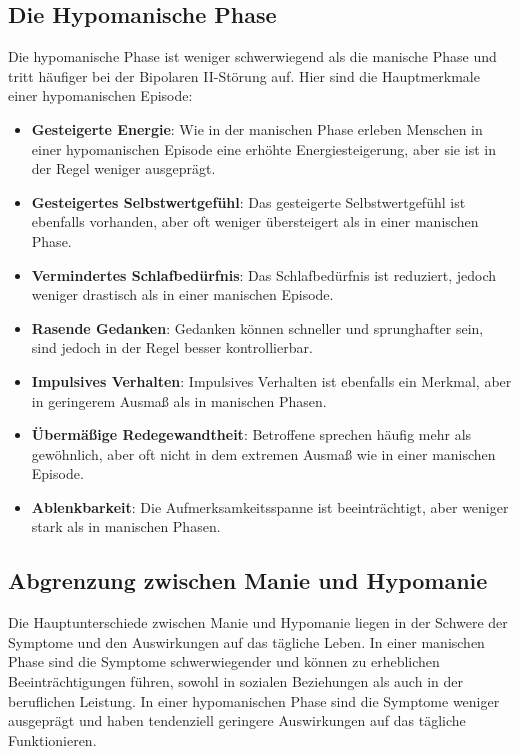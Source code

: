 \subsection{Die Hypomanische Phase}

Die hypomanische Phase ist weniger schwerwiegend als die manische Phase und tritt häufiger bei der Bipolaren II-Störung auf. Hier sind die Hauptmerkmale einer hypomanischen Episode:

\begin{itemize}
  \item \textbf{Gesteigerte Energie}: Wie in der manischen Phase erleben Menschen in einer hypomanischen Episode eine erhöhte Energiesteigerung, aber sie ist in der Regel weniger ausgeprägt.
  
  \item \textbf{Gesteigertes Selbstwertgefühl}: Das gesteigerte Selbstwertgefühl ist ebenfalls vorhanden, aber oft weniger übersteigert als in einer manischen Phase.
  
  \item \textbf{Vermindertes Schlafbedürfnis}: Das Schlafbedürfnis ist reduziert, jedoch weniger drastisch als in einer manischen Episode.
  
  \item \textbf{Rasende Gedanken}: Gedanken können schneller und sprunghafter sein, sind jedoch in der Regel besser kontrollierbar.
  
  \item \textbf{Impulsives Verhalten}: Impulsives Verhalten ist ebenfalls ein Merkmal, aber in geringerem Ausmaß als in manischen Phasen.
  
  \item \textbf{Übermäßige Redegewandtheit}: Betroffene sprechen häufig mehr als gewöhnlich, aber oft nicht in dem extremen Ausmaß wie in einer manischen Episode.
  
  \item \textbf{Ablenkbarkeit}: Die Aufmerksamkeitsspanne ist beeinträchtigt, aber weniger stark als in manischen Phasen.
\end{itemize}

\subsection{Abgrenzung zwischen Manie und Hypomanie}

Die Hauptunterschiede zwischen Manie und Hypomanie liegen in der Schwere der Symptome und den Auswirkungen auf das tägliche Leben. In einer manischen Phase sind die Symptome schwerwiegender und können zu erheblichen Beeinträchtigungen führen, sowohl in sozialen Beziehungen als auch in der beruflichen Leistung. In einer hypomanischen Phase sind die Symptome weniger ausgeprägt und haben tendenziell geringere Auswirkungen auf das tägliche Funktionieren.

